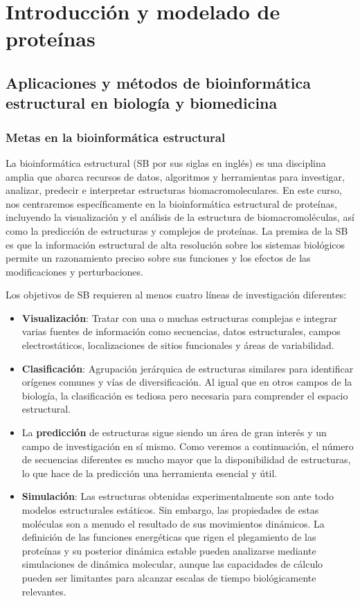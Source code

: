 \part{Introducción y modelado de proteínas}
\chapter{Aplicaciones y métodos de bioinformática estructural en biología y biomedicina}
\section{Metas en la bioinformática estructural}
La bioinformática estructural (SB por sus siglas en inglés) es una disciplina amplia que abarca recursos de datos, algoritmos y herramientas para investigar, analizar, predecir e interpretar estructuras biomacromoleculares. En este curso, nos centraremos específicamente en la bioinformática estructural de proteínas, incluyendo la visualización y el análisis de la estructura de biomacromoléculas, así como la predicción de estructuras y complejos de proteínas. La premisa de la SB es que la información estructural de alta resolución sobre los sistemas biológicos permite un razonamiento preciso sobre sus funciones y los efectos de las modificaciones y perturbaciones.

Los objetivos de SB requieren al menos cuatro líneas de investigación diferentes:
\begin{itemize}
\item \textbf{Visualización}: Tratar con una o muchas estructuras complejas e integrar varias fuentes de información como secuencias, datos estructurales, campos electrostáticos, localizaciones de sitios funcionales y áreas de variabilidad.
\item \textbf{Clasificación}: Agrupación jerárquica de estructuras similares para identificar orígenes comunes y vías de diversificación. Al igual que en otros campos de la biología, la clasificación es tediosa pero necesaria para comprender el espacio estructural.
\item La \textbf{predicción} de estructuras sigue siendo un área de gran interés y un campo de investigación en sí mismo. Como veremos a continuación, el número de secuencias diferentes es mucho mayor que la disponibilidad de estructuras, lo que hace de la predicción una herramienta esencial y útil.
\item \textbf{Simulación}: Las estructuras obtenidas experimentalmente son ante todo modelos estructurales estáticos. Sin embargo, las propiedades de estas moléculas son a menudo el resultado de sus movimientos dinámicos. La definición de las funciones energéticas que rigen el plegamiento de las proteínas y su posterior dinámica estable pueden analizarse mediante simulaciones de dinámica molecular, aunque las capacidades de cálculo pueden ser limitantes para alcanzar escalas de tiempo biológicamente relevantes.
\end{itemize}

